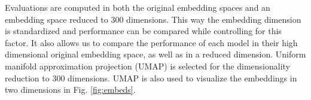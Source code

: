 Evaluations are computed in both the original embedding spaces and an embedding space reduced to 300 dimensions.
This way the embedding dimension is standardized and performance can be compared while controlling for this factor.
It also allows us to compare the performance of each model in their high dimensional original embedding space, as well as in a reduced dimension.
Uniform manifold approximation projection (UMAP) \cite{mcinnes_umap_2020} is selected for the dimensionality reduction to 300 dimensions.
UMAP is also used to visualize the embeddings in two dimensions in Fig. \ref{fig:embeds}.